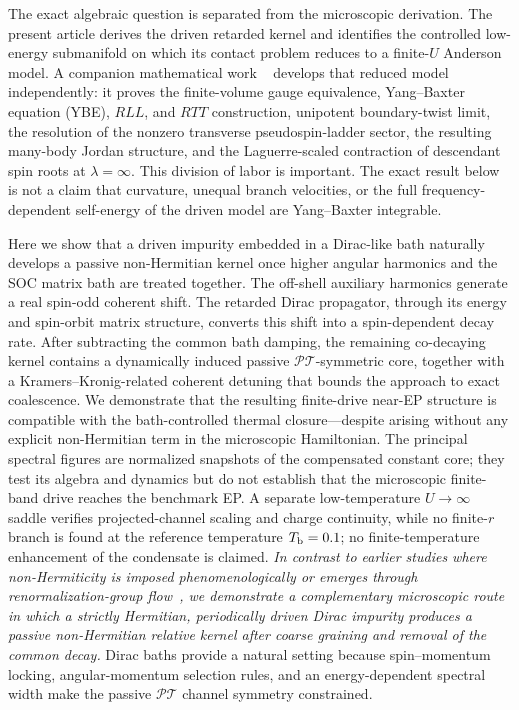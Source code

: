 \documentclass[%
  aps,prb,reprint,amsmath,amssymb,superscriptaddress,longbibliography,floatfix
]{revtex4-2}
\newcommand{\PT}{\mathcal{PT}}
\begin{document}
The exact algebraic question is separated from the microscopic derivation.
The present article derives the driven retarded kernel and identifies the
controlled low-energy submanifold on which its contact problem reduces to a
finite-$U$ Anderson model.  A companion mathematical work
~\cite{KulkarniYB2026} develops that reduced model independently: it proves
the finite-volume gauge equivalence, Yang--Baxter equation (YBE), $RLL$, and
$RTT$ construction, unipotent
boundary-twist limit, the resolution of the nonzero transverse
pseudospin-ladder sector, the resulting many-body Jordan structure, and the
Laguerre-scaled contraction of descendant spin roots at
\(\lambda=\infty\).  This
division of labor is important.  The exact result below is not a claim that
curvature, unequal branch velocities, or the full frequency-dependent
self-energy of the driven model are Yang--Baxter integrable.

Here we show that a driven impurity embedded in a Dirac-like bath
naturally develops a passive non-Hermitian kernel once higher angular
harmonics and the SOC matrix bath are treated together.
The off-shell auxiliary harmonics generate a real spin-odd coherent
shift.  The retarded Dirac propagator, through its energy and
spin-orbit matrix structure, converts this shift into a spin-dependent decay
rate.  After subtracting the common bath damping, the remaining
co-decaying kernel contains a dynamically induced passive
$\PT$-symmetric core, together with a Kramers--Kronig-related coherent
detuning that bounds the approach to exact coalescence.
We demonstrate that the resulting finite-drive near-EP structure is compatible
with the bath-controlled thermal closure---despite arising without any
explicit non-Hermitian term in the microscopic Hamiltonian.  The principal
spectral figures are normalized snapshots of the compensated constant core;
they test its algebra and dynamics but do not establish that the microscopic
finite-band drive reaches the benchmark EP.  A separate low-temperature
$U\to\infty$ saddle verifies projected-channel scaling and charge continuity,
while no finite-$r$ branch is found at the reference temperature
$T_{\rm b}=0.1$; no finite-temperature enhancement of the condensate is
claimed.
\emph{In contrast to earlier studies where non-Hermiticity is
imposed phenomenologically or emerges through renormalization-group
flow~\cite{PhysRevLett.121.203001,han2023complex,
PhysRevB.111.045124}, we demonstrate a complementary microscopic
route in which a strictly Hermitian, periodically driven Dirac impurity
produces a passive non-Hermitian relative kernel after coarse graining
and removal of the common decay.}
Dirac baths provide a natural setting because spin--momentum
locking, angular-momentum selection rules, and an energy-dependent
spectral width make the passive $\PT$ channel symmetry constrained.
\end{document}

